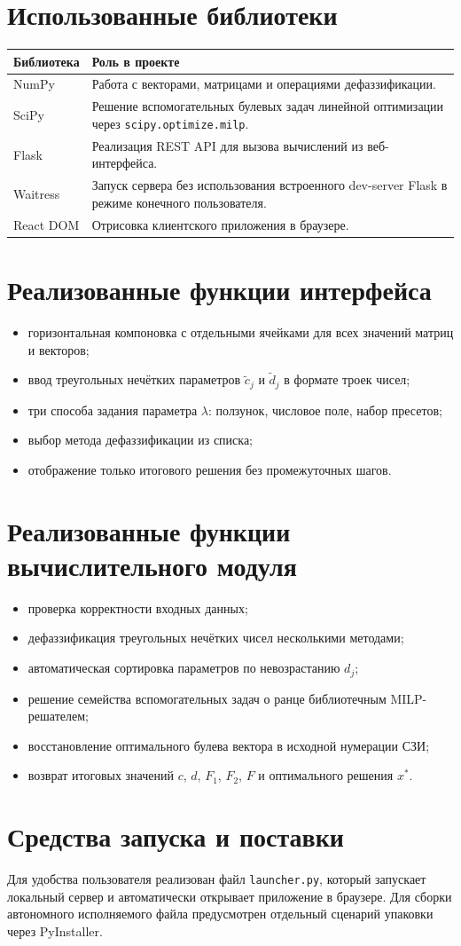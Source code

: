 \documentclass[12pt,a4paper]{article}
\begin{document}
\section*{Использованные библиотеки}
\begin{longtable}{|p{4cm}|p{10cm}|}
\hline
\textbf{Библиотека} & \textbf{Роль в проекте} \\\hline
NumPy & Работа с векторами, матрицами и операциями дефаззификации. \\\hline
SciPy & Решение вспомогательных булевых задач линейной оптимизации через \texttt{scipy.optimize.milp}. \\\hline
Flask & Реализация REST API для вызова вычислений из веб-интерфейса. \\\hline
Waitress & Запуск сервера без использования встроенного dev-server Flask в режиме конечного пользователя. \\\hline
React DOM & Отрисовка клиентского приложения в браузере. \\\hline
\end{longtable}

\section*{Реализованные функции интерфейса}
\begin{itemize}
    \item горизонтальная компоновка с отдельными ячейками для всех значений матриц и векторов;
    \item ввод треугольных нечётких параметров \(\tilde{c}_j\) и \(\tilde{d}_j\) в формате троек чисел;
    \item три способа задания параметра \(\lambda\): ползунок, числовое поле, набор пресетов;
    \item выбор метода дефаззификации из списка;
    \item отображение только итогового решения без промежуточных шагов.
\end{itemize}

\section*{Реализованные функции вычислительного модуля}
\begin{itemize}
    \item проверка корректности входных данных;
    \item дефаззификация треугольных нечётких чисел несколькими методами;
    \item автоматическая сортировка параметров по невозрастанию \(d_j\);
    \item решение семейства вспомогательных задач о ранце библиотечным MILP-решателем;
    \item восстановление оптимального булева вектора в исходной нумерации СЗИ;
    \item возврат итоговых значений \(c\), \(d\), \(F_1\), \(F_2\), \(F\) и оптимального решения \(x^*\).
\end{itemize}

\section*{Средства запуска и поставки}
Для удобства пользователя реализован файл \texttt{launcher.py}, который запускает локальный сервер и автоматически открывает приложение в браузере. Для сборки автономного исполняемого файла предусмотрен отдельный сценарий упаковки через PyInstaller.
\end{document}
